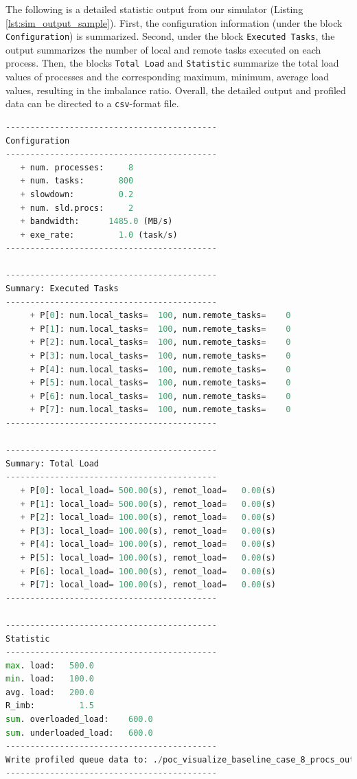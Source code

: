 The following is a detailed statistic output from our simulator (Listing \ref{lst:sim_output_sample}). First, the configuration information (under the block \texttt{Configuration}) is summarized. Second, under the block \texttt{Executed Tasks}, the output summarizes the number of local and remote tasks executed on each process. Then, the blocks \texttt{Total Load} and \texttt{Statistic} summarize the total load values of processes and the corresponding maximum, minimum, average load values, resulting in the imbalance ratio. Overall, the detailed output and profiled data can be directed to a \texttt{csv}-format file.

\begin{lstlisting}[language=Python, caption={The output of the baseline simulation.}, label={lst:sim_output_sample}]
-------------------------------------------
Configuration
-------------------------------------------
   + num. processes:     8
   + num. tasks:       800
   + slowdown:         0.2
   + num. sld.procs:     2
   + bandwidth:      1485.0 (MB/s)
   + exe_rate:         1.0 (task/s)
-------------------------------------------

-------------------------------------------
Summary: Executed Tasks
-------------------------------------------
	 + P[0]: num.local_tasks=  100, num.remote_tasks=    0
	 + P[1]: num.local_tasks=  100, num.remote_tasks=    0
	 + P[2]: num.local_tasks=  100, num.remote_tasks=    0
	 + P[3]: num.local_tasks=  100, num.remote_tasks=    0
	 + P[4]: num.local_tasks=  100, num.remote_tasks=    0
	 + P[5]: num.local_tasks=  100, num.remote_tasks=    0
	 + P[6]: num.local_tasks=  100, num.remote_tasks=    0
	 + P[7]: num.local_tasks=  100, num.remote_tasks=    0
-------------------------------------------

-------------------------------------------
Summary: Total Load
-------------------------------------------
   + P[0]: local_load= 500.00(s), remot_load=   0.00(s)
   + P[1]: local_load= 500.00(s), remot_load=   0.00(s)
   + P[2]: local_load= 100.00(s), remot_load=   0.00(s)
   + P[3]: local_load= 100.00(s), remot_load=   0.00(s)
   + P[4]: local_load= 100.00(s), remot_load=   0.00(s)
   + P[5]: local_load= 100.00(s), remot_load=   0.00(s)
   + P[6]: local_load= 100.00(s), remot_load=   0.00(s)
   + P[7]: local_load= 100.00(s), remot_load=   0.00(s)
-------------------------------------------

-------------------------------------------
Statistic
-------------------------------------------
max. load:   500.0
min. load:   100.0
avg. load:   200.0
R_imb:         1.5
sum. overloaded_load:    600.0
sum. underloaded_load:   600.0
-------------------------------------------
Write profiled queue data to: ./poc_visualize_baseline_case_8_procs_output.csv
-------------------------------------------
\end{lstlisting}
\hfill

